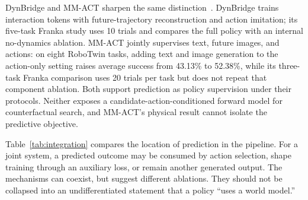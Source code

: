 DynBridge and MM-ACT sharpen the same distinction~\cite{wang2026dynbridge,liang2026mmact}. DynBridge trains interaction tokens with future-trajectory reconstruction and action imitation; its five-task Franka study uses 10 trials and compares the full policy with an internal no-dynamics ablation. MM-ACT jointly supervises text, future images, and actions: on eight RoboTwin tasks, adding text and image generation to the action-only setting raises average success from 43.13\% to 52.38\%, while its three-task Franka comparison uses 20 trials per task but does not repeat that component ablation. Both support prediction as policy supervision under their protocols. Neither exposes a candidate-action-conditioned forward model for counterfactual search, and MM-ACT's physical result cannot isolate the predictive objective.

Table~\ref{tab:integration} compares the location of prediction in the pipeline. For a joint system, a predicted outcome may be consumed by action selection, shape training through an auxiliary loss, or remain another generated output. The mechanisms can coexist, but suggest different ablations. They should not be collapsed into an undifferentiated statement that a policy ``uses a world model.''

